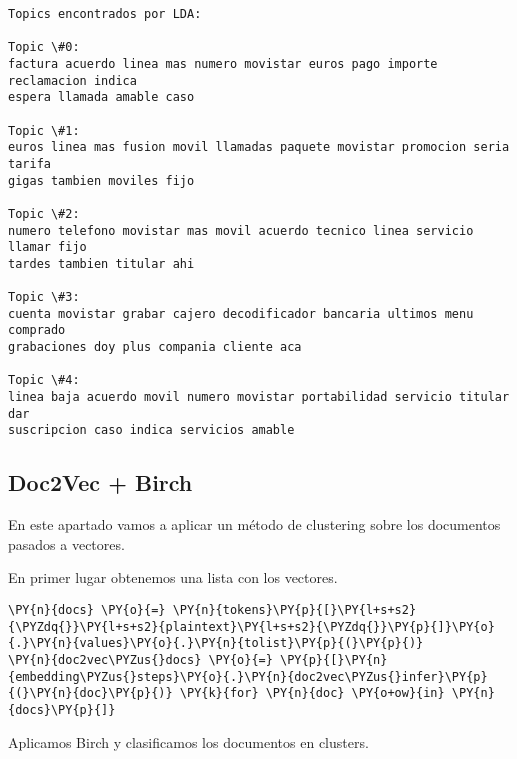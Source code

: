     \begin{Verbatim}[commandchars=\\\{\}]
Topics encontrados por LDA:

Topic \#0:
factura acuerdo linea mas numero movistar euros pago importe reclamacion indica
espera llamada amable caso

Topic \#1:
euros linea mas fusion movil llamadas paquete movistar promocion seria tarifa
gigas tambien moviles fijo

Topic \#2:
numero telefono movistar mas movil acuerdo tecnico linea servicio llamar fijo
tardes tambien titular ahi

Topic \#3:
cuenta movistar grabar cajero decodificador bancaria ultimos menu comprado
grabaciones doy plus compania cliente aca

Topic \#4:
linea baja acuerdo movil numero movistar portabilidad servicio titular dar
suscripcion caso indica servicios amable
    \end{Verbatim}

    \hypertarget{doc2vec-birch}{%
\subsection{Doc2Vec + Birch}\label{doc2vec-birch}}

    En este apartado vamos a aplicar un método de clustering sobre los
documentos pasados a vectores.

    En primer lugar obtenemos una lista con los vectores.

    \begin{tcolorbox}[breakable, size=fbox, boxrule=1pt, pad at break*=1mm,colback=cellbackground, colframe=cellborder]
\begin{Verbatim}[commandchars=\\\{\}]
\PY{n}{docs} \PY{o}{=} \PY{n}{tokens}\PY{p}{[}\PY{l+s+s2}{\PYZdq{}}\PY{l+s+s2}{plaintext}\PY{l+s+s2}{\PYZdq{}}\PY{p}{]}\PY{o}{.}\PY{n}{values}\PY{o}{.}\PY{n}{tolist}\PY{p}{(}\PY{p}{)}
\PY{n}{doc2vec\PYZus{}docs} \PY{o}{=} \PY{p}{[}\PY{n}{embedding\PYZus{}steps}\PY{o}{.}\PY{n}{doc2vec\PYZus{}infer}\PY{p}{(}\PY{n}{doc}\PY{p}{)} \PY{k}{for} \PY{n}{doc} \PY{o+ow}{in} \PY{n}{docs}\PY{p}{]}
\end{Verbatim}
\end{tcolorbox}

    Aplicamos Birch y clasificamos los documentos en clusters.

